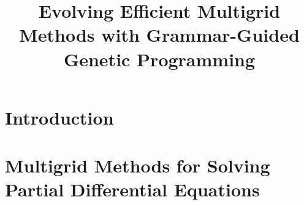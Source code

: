 \documentclass[
  paper = 17x24,
  language = english,
  acronym = split,
  acronymline = novertical,
  bibliography = false,
  bibliographypart = false,
  titlesize = Huge,
  par = halfskip,
]{faupress}
\title{Evolving Efficient Multigrid Methods with Grammar-Guided Genetic Programming}
\institute{Lehrstuhl für Informatik 10}
\theoremstyle{definition}
\begin{document}
\maketitle

\frontmatter
  
  \makefacultytitle

  \begin{preface}
   
    
  \end{preface}

  \tableofcontents

  \faupressprintacronyms
  
  \listoffigures
  
  \listoftables

\mainmatter

\chapter{Introduction}
    

\chapter{Multigrid Methods for Solving Partial Differential Equations}
  
  
  
\end{document}
